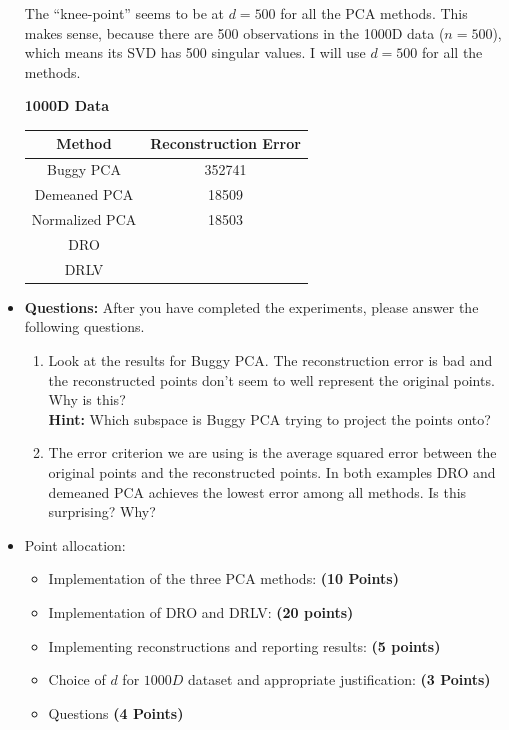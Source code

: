 \begin{itemize}
\begin{soln}
  The ``knee-point'' seems to be at $d = 500$ for all the PCA methods.
  This makes sense, because there are 500 observations in the 1000D data ($n=500$), which means its SVD has 500 singular values.
  I will use $d=500$ for all the methods.

  \begin{center}
    \textbf{1000D Data} \\
    \begin{tabular}{ c  c }
      \hline
      Method & Reconstruction Error \\ \hline
      Buggy PCA & 352741 \\
      Demeaned PCA & 18509 \\
      Normalized PCA & 18503 \\
      DRO & \\
      DRLV & \\
      \hline
    \end{tabular}
  \end{center}
\end{soln}

\item \textbf{Questions:} After you have completed the experiments, please answer the following questions.
\begin{enumerate}
\item Look at the results for Buggy PCA. The reconstruction error is bad and the
reconstructed points don't seem to well represent the original points. Why is
this? \\
\textbf{Hint: } Which subspace is Buggy PCA trying to project the points
onto?
\item The error criterion we are using is the average squared error 
between the original points and the reconstructed points.
In both examples DRO and demeaned PCA achieves the lowest error among all
methods. 
Is this surprising? Why?
\end{enumerate}

\item Point allocation:
\begin{itemize}
\item Implementation of the three PCA methods: \textbf{(10 Points)}
\item Implementation of DRO and DRLV: \textbf{(20 points)}
\item Implementing reconstructions and reporting results: \textbf{(5 points)}
\item Choice of $d$ for $1000D$ dataset and appropriate justification:
\textbf{(3 Points)}
\item Questions \textbf{(4 Points)}
\end{itemize}

\end{itemize}


